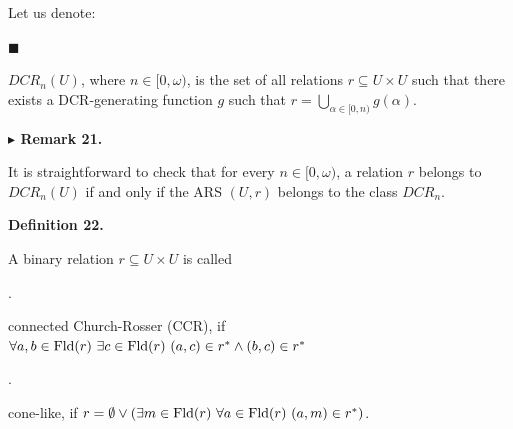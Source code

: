  
 
Let us denote:\par
  
\par\noindent  $\blacksquare$ 
 
$DCR_{n}(U)$, where $n\in[0,\omega)$, is the set of all relations $r\subseteq U\times U$ such that there exists a DCR-generating function $g$ such that $r=\bigcup_{\alpha\in[0,n)}g(\alpha)$.\par
 
 
  
 
 
\par\medskip\noindent\textbf{$\blacktriangleright$ Remark 21.}\par
 
 
It is straightforward to check that for every $n\in[0,\omega)$, a relation $r$ belongs to $DCR_{n}(U)$ if and only if the ARS $(U,r)$ belongs to the class $DCR_{n}$.\par
 
 
 
 
\par\medskip\noindent\textbf{Definition 22.}\par
 
 
A binary relation $r\subseteq U\times U$ is called\par
  
\par{}. 
 
connected Church-Rosser (CCR), if $\forall a,b\in\mathrm{Fld}(r)\leavevmode\nobreak\ \exists c\in\mathrm{Fld}(r)%
\leavevmode\nobreak\ (a,c)\in r^{*}\wedge(b,c)\in r^{*}$\par
 
 
 
\par{}. 
 
cone-like, if $r=\emptyset\vee(\exists m\in\mathrm{Fld}(r)\leavevmode\nobreak\ \forall a\in%
\mathrm{Fld}(r)\leavevmode\nobreak\ (a,m)\in r^{*})$.\par
 

